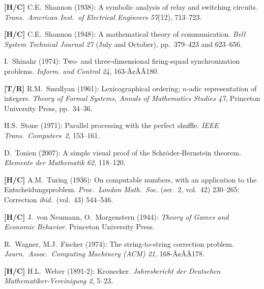 \begin{thebibliography}{999}
{\bf [H/C]}
C.E.~Shannon (1938): A symbolic analysis of relay and switching circuits.  {\it Trans.~American Inst.~of Electrical Engineers 57}(12), 713--723.

{\bf [H/C]}
C.E.~Shannon (1948): A mathematical theory of communication.  {\it Bell System Technical Journal 27} (July and October), pp.~379--423 and 623--656.

I.~Shinahr (1974): Two- and three-dimensional firing-squad synchronization problems.  {\it Inform. and Control 24}, 163-Ã¢ÂÂ180.

{\bf [T/R]}
R.M.~Smullyan (1961):  Lexicographical ordering; $n$-adic representation of integers.  
{\it Theory of Formal Systems, Annals of Mathematics Studies 47}, Princeton University Press, pp.~34--36.

H.S.~Stone (1971): Parallel processing with the perfect shuffle.  {\it IEEE Trans.~Computers~2}, 153--161.




D.~Tonien (2007):  A simple visual proof of the Schr\"{o}der-Bernstein theorem.  {\it Elemente der Mathematik 62}, 118--120.

{\bf [H/C]}
A.M.~Turing (1936): On computable numbers, with an application to the Entscheidungsproblem.  {\it Proc.~London Math.~Soc.} (ser.~2, vol.~42) 230--265; Correction {\it ibid.}~(vol.~43) 544--546.




{\bf [H/C]}
J.~von Neumann, O.~Morgenstern (1944): {\it Theory of Games and Economic Behavior.}
Princeton University Press.


R.~Wagner, M.J.~Fischer (1974): The string-to-string correction problem.
{\it Journ.~Assoc.~Computing Machinery (ACM) 21}, 168-Ã¢ÂÂ178.

{\bf [H/C]}
H.L.~Weber (1891-2): Kronecker.
{\it Jahresbericht der Deutschen Mathematiker-Vereinigung 2}, 5--23.


\end{thebibliography}
